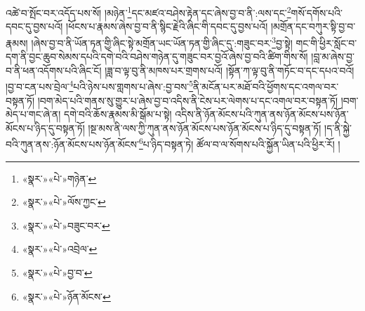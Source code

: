 འཚེ་བ་སྤོང་བར་འདོད་པས་སོ། །མཉེན་\footnote{«སྣར་»«པེ་»གཉེན་}དང་མཛའ་བཤེས་རྟེན་དང་ཞེས་བྱ་བ་ནི་:ལས་དང་\footnote{«སྣར་»«པེ་»ལོས་ཀྱང་}གསོ་དགོས་པའི་དབང་དུ་བྱས་པའོ། །ཕོངས་པ་རྣམས་ཞེས་བྱ་བ་ནི་སྙིང་རྗེའི་ཞིང་གི་དབང་དུ་བྱས་པའོ། །མགྲོན་དང་བཀུར་སྟི་བྱ་བ་རྣམས། །ཞེས་བྱ་བ་ནི་ཡོན་ཏན་གྱི་ཞིང་སྟེ་མགྲོན་ཡང་ཡོན་ཏན་གྱི་ཞིང་དུ་:གཟུང་བར་\footnote{«སྣར་»«པེ་»བཟུང་བར་}བྱ་སྟེ། གང་གི་ཕྱིར་སློང་བ་དག་ནི་བྱང་ཆུབ་སེམས་དཔའི་དགེ་བའི་བཤེས་གཉེན་དུ་གཟུང་བར་བྱའོ་ཞེས་བྱ་བའི་ཚིག་གིས་སོ། །བླ་མ་ཞེས་བྱ་བ་ནི་ཕན་འདོགས་པའི་ཞིང་ངོ། །ཟླ་བ་ལྟ་བུ་ནི་མཁས་པར་གྲགས་པའོ། །སྟོན་ཀ་ལྟ་བུ་ནི་གཏོང་བ་དང་དཔའ་བའོ། །བྱ་བ་ངན་པས་བྲེལ་\footnote{«སྣར་»«པེ་»འབྲེལ་}པའི་ཉེས་པས་གླགས་པ་ཞེས་:བྱ་བས་\footnote{«སྣར་»«པེ་»བྱ་བ་}ནི་མངོན་པར་མཐོ་བའི་ཕྱོགས་དང་འགལ་བར་བསྟན་ཏོ། །བག་མེད་པའི་གནས་སུ་གྱུར་པ་ཞེས་བྱ་བ་འདིས་ནི་ངེས་པར་ལེགས་པ་དང་འགལ་བར་བསྟན་ཏོ། །བག་མེད་པ་གང་ཞེ་ན། དགེ་བའི་ཆོས་རྣམས་མི་སྒོམ་པ་སྟེ། འདིས་ནི་ཉོན་མོངས་པའི་ཀུན་ནས་ཉོན་མོངས་པས་ཉོན་མོངས་པ་ཉིད་དུ་བསྟན་ཏོ། །སྔ་མས་ནི་ལས་ཀྱི་ཀུན་ནས་ཉོན་མོངས་པས་ཉོན་མོངས་པ་ཉིད་དུ་བསྟན་ཏོ། །ད་ནི་སྐྱེ་བའི་ཀུན་ནས་:ཉོན་མོངས་པས་ཉོན་མོངས་\footnote{«སྣར་»«པེ་»ཉོན་མོངས་}པ་ཉིད་བསྟན་ཏེ། ཚོལ་བ་ལ་སོགས་པའི་སྐྱོན་ཡིན་པའི་ཕྱིར་རོ། །
